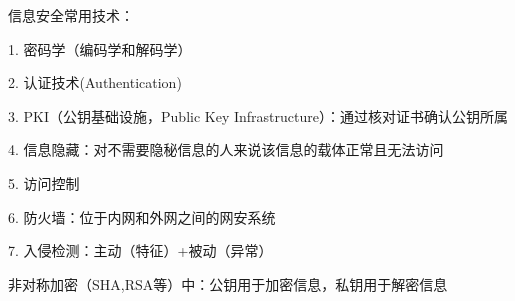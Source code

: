 \begin{notation}
    信息安全常用技术：

    1. 密码学（编码学和解码学）

    2. 认证技术(Authentication)

    3. PKI（公钥基础设施，Public Key Infrastructure）：通过核对证书确认公钥所属

    4. 信息隐藏：对不需要隐秘信息的人来说该信息的载体正常且无法访问

    5. 访问控制

    6. 防火墙：位于内网和外网之间的网安系统

    7. 入侵检测：主动（特征）+被动（异常）
\end{notation}
\begin{notation}
    非对称加密（SHA,RSA等）中：公钥用于加密信息，私钥用于解密信息
\end{notation}











































